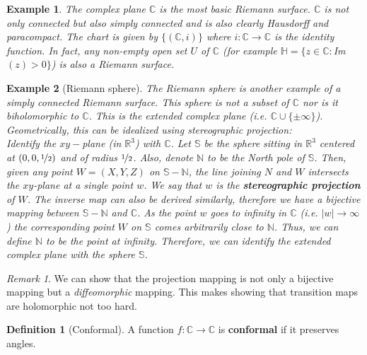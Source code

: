 \documentclass[a4paper, 11pt]{book}
\newtheorem*{example}{Example}
\theoremstyle{definition}
\newtheorem{definition}{Definition}[section]
\theoremstyle{remark}
\newtheorem*{remark}{Remark}
\begin{document}
    \begin{example}
        The complex plane $\mathbb{C}$ is the most basic Riemann surface. $\mathbb{C}$ is not only connected but also
        \textit{simply} connected and is also clearly Hausdorff and paracompact. The chart is given by $\{(\mathbb{C},i)\}$
        where $i: \mathbb{C}\to\mathbb{C}$ is the identity function. In fact, any non-empty open set $U$ of $\mathbb{C}$ (for example
        $\mathbb{H} = \{z\in\mathbb{C}: $Im$(z)>0\}$) is also a Riemann surface.
    \end{example}

    \begin{example}[Riemann sphere]
        The Riemann sphere is another example of a \textit{simply} connected Riemann surface. This sphere is not a subset
        of $\mathbb{C}$ nor is it biholomorphic to $\mathbb{C}$. This is the extended complex plane (i.e. $\mathbb{C}\cup\{\pm\infty\}$).
        Geometrically, this can be idealized using \textit{stereographic projection}:\\
        Identify the $xy-$plane (in $\mathbb{R}^3$) with $\mathbb{C}$. Let $\mathbb{S}$ be the sphere sitting in $\mathbb{R}^3$ centered
        at $(0,0,\nicefrac{1}{2})$ and of radius $\nicefrac{1}{2}$. Also, denote $\mathbb{N}$ to be the North pole of $\mathbb{S}$.
        Then, given any point $W = (X,Y,Z)$ on $\mathbb{S}-\mathbb{N}$, the line joining $N$ and $W$ intersects the $xy$-plane at
        a single point $w$. We say that $w$ is the \textbf{stereographic projection} of $W$. The inverse map can also be derived
        similarly, therefore we have a bijective mapping between $\mathbb{S}-\mathbb{N}$ and $\mathbb{C}$. As the point $w$ goes to
        infinity in $\mathbb{C}$ (i.e. $|w|\to\infty$) the corresponding point $W$ on $\mathbb{S}$ comes arbitrarily close to 
        $\mathbb{N}$. Thus, we can define $\mathbb{N}$ to be the point at infinity. Therefore, we can identify the extended complex 
        plane with the sphere $\mathbb{S}$.
    \end{example}

    \begin{remark}
        We can show that the projection mapping is not only a bijective mapping but a \textit{diffeomorphic} mapping. This makes
        showing that transition maps are holomorphic not too hard.
    \end{remark}

    \begin{definition}[Conformal]
        A function $f:\mathbb{C}\to\mathbb{C}$ is \textbf{conformal} if it preserves angles.
    \end{definition}
\end{document}
